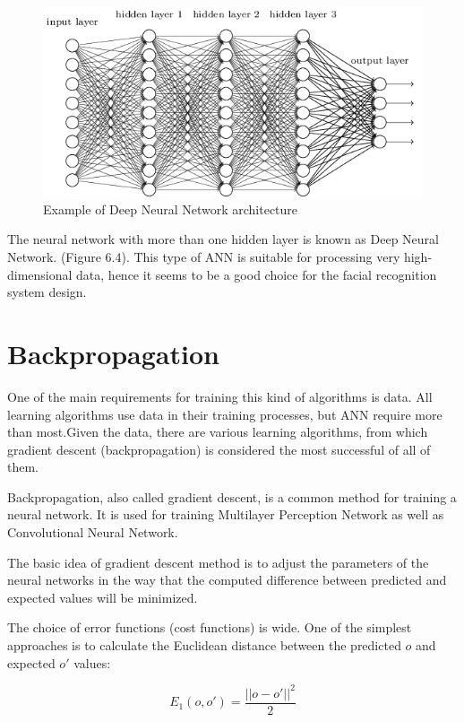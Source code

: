 \begin{figure}[H]
\centering
\includegraphics[scale=0.65]{img/neural_net.png}
\caption{Example of Deep Neural Network architecture}
\end{figure}

The neural network with more than one hidden layer is known as Deep Neural Network. (Figure 6.4). This type of ANN is suitable for processing very high-dimensional data, hence it seems to be a good choice for the facial recognition system design. 


\section{Backpropagation}

One of the main requirements for training this kind of algorithms is data. All learning algorithms use data in their training processes, but ANN require more than most.Given the data, there are various learning algorithms, from which gradient descent (backpropagation) is considered the most successful of all of them.


Backpropagation, also called gradient descent, is a common method for training a neural network. It is used for training Multilayer Perception Network as well as Convolutional Neural Network.

The basic idea of gradient descent method is to adjust the parameters of the neural networks in the way that the computed difference between predicted and expected values will be minimized. 

The choice of error functions (cost functions) is wide. One of the simplest approaches is to calculate the Euclidean distance between the predicted $o$ and expected $o'$ values: 

\begin{equation}
E_{1}(o,o') = \frac{||o-o'||^{2}}{2}
\end{equation}

